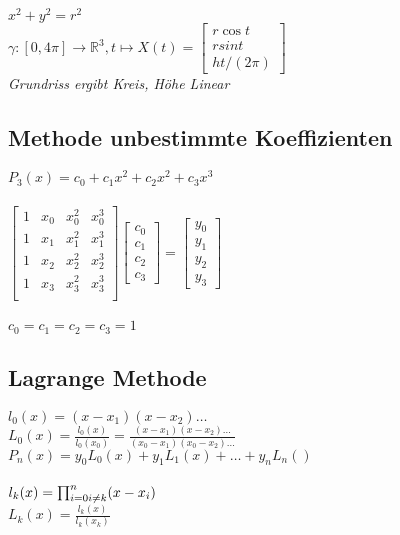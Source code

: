 $x^2 + y^2 = r^2$ \\
$\gamma : [0, 4\pi] \rightarrow \mathbb{R}^3, t \mapsto X(t) = \begin{bmatrix}
    r \cos t \\ r sin t \\ ht / (2\pi)
\end{bmatrix}$ \\
\textit{Grundriss ergibt Kreis, Höhe Linear}

\subsection{Methode unbestimmte Koeffizienten}

$P_3(x) = c_0 + c_1x^2 + c_2x^2 + c_3x^3$ \\
\\
$\begin{bmatrix}
    1 & x_0 & x_0^2 & x_0^3 \\
    1 & x_1 & x_1^2 & x_1^3 \\
    1 & x_2 & x_2^2 & x_2^3 \\
    1 & x_3 & x_3^2 & x_3^3 \\
\end{bmatrix} 
\begin{bmatrix}
    c_0 \\
    c_1 \\
    c_2 \\
    c_3
\end{bmatrix} = 
\begin{bmatrix}
    y_0 \\
    y_1 \\
    y_2 \\
    y_3
\end{bmatrix}$ \\
\\
\textit{$c_0 = c_1 = c_2 = c_3 = 1$}

\subsection{Lagrange Methode}

$l_0(x) = (x-x_1)(x-x_2)\dots$ \\
$L_0(x) = \frac{l_0(x)}{l_0(x_0)} = \frac{(x-x_1)(x-x_2)\dots}{(x_0-x_1)(x_0-x_2)\dots}$ \\
$P_n(x) = y_0L_0(x)+y_1L_1(x)+ \dots + y_nL_n()$ \\
\\
$l_k(x) = \prod^{n}_{i=0 \\ i \neq k}(x-x_i)$ \\
$L_k(x) = \frac{l_k(x)}{l_k(x_k)}$

